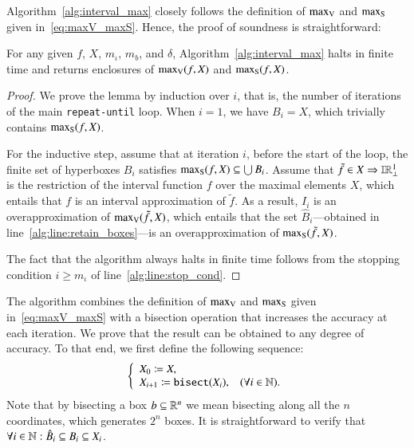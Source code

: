\documentclass[11pt,times]{article}
\begin{document}
Algorithm~\ref{alg:interval_max} closely follows the definition of
$\maxV$ and $\maxS$ given in~\eqref{eq:maxV_maxS}. Hence, the proof of
soundness is straightforward:

\begin{lemma}
  \label{lemma:soundness_maximization}
  For any given $f$, $X$, $m_{\iota}$, $m_b$, and $\delta$,
  Algorithm~\ref{alg:interval_max} halts in finite time and returns
  enclosures of $\maxV(f,X)$ and $\maxS(f,X)$.
\end{lemma}
%
\begin{proof}
  We prove the lemma by induction over $i$, that is, the number of
  iterations of the main \texttt{repeat-until} loop. When $i=1$, we
  have $B_i = X$, which trivially contains $\maxS(f, X)$.

  
For the inductive step, assume that at iteration $i$, before the start
of the loop, the finite set of hyperboxes $B_i$ satisfies
$\maxS(f,X) \subseteq \bigcup B_i$. Assume that
$\tilde{f} \in X \Rightarrow \intvaldom[\R^1\lift]$ is the restriction of
the interval function $f$ over the maximal elements $X$, which entails
that $f$ is an interval approximation of $\tilde{f}$. As a result,
$I_i$ is an overapproximation of $\maxV(\tilde{f},X)$, which entails
that the set $\hat{B}_i$---obtained in
line~\ref{alg:line:retain_boxes}---is an overapproximation of
$\maxS(\tilde{f},X)$.

The fact that the algorithm always halts in finite time follows from
the stopping condition $i \geq m_{\iota}$ of line~\ref{alg:line:stop_cond}.
\end{proof}


The algorithm combines the definition of $\maxV$ and $\maxS$ given
in~\eqref{eq:maxV_maxS} with a bisection operation that increases the
accuracy at each iteration. We prove that the result can be obtained
to any degree of accuracy. To that end, we first define the following
sequence:
%
\begin{equation}
  \label{eq:X_i_Seq}
  \left\{
    \begin{array}{ll}
      X_0 \defeq X, &\\
      X_{i+1} \defeq \mathtt{bisect}(X_i), & (\forall i \in \N).
    \end{array}
  \right.
\end{equation}
%
Note that by bisecting a box $b \subseteq \R^n$ we mean bisecting
along all the $n$ coordinates, which generates $2^n$ boxes. It is
straightforward to verify that
$\forall i \in \N: \hat{B}_i \subseteq B_i \subseteq X_i$.
\end{document}
